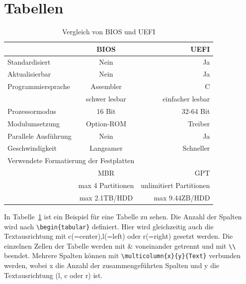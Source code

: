 \section{Tabellen}
\begin{table}[ht]
    \centering
    \begin{tabular}{ l c r }
        \toprule
                                & BIOS              & UEFI              \\
        \toprule
        \toprule
        Standardisiert          & Nein              & Ja                \\
        \midrule
        \midrule
        Aktualisierbar          & Nein              & Ja                \\
        \midrule
        \midrule
        Programmiersprache      & Assembler         & C                 \\
                                & schwer lesbar     & einfacher lesbar  \\
        \midrule
        \midrule
        Prozessormodus          & 16 Bit            & 32-64 Bit         \\
        Modulumsetzung          & Option-ROM        & Treiber           \\
        Parallele Ausführung    & Nein              & Ja                \\
        Geschwindigkeit         & Langsamer         & Schneller         \\
        \midrule
        \midrule
        \multicolumn{3}{l}{Verwendete Formatierung der Festplatten}\\
        \midrule
                                & MBR               & GPT               \\
                                & max 4 Partitionen & unlimitiert Partitionen\\
                                & max 2.1TB/HDD     & max 9.44ZB/HDD    \\
        \bottomrule
    \end{tabular}
    \caption{Vergleich von BIOS und UEFI}\label{tab:bios_uefi}
\end{table}

In Tabelle~\ref{tab:bios_uefi} ist ein Beispiel für eine Tabelle zu sehen.
Die Anzahl der Spalten wird nach \lstinline|\begin{tabular}| definiert.
Hier wird gleichzeitig auch die Textausrichtung mit c(=center),l(=left) oder r(=right) gesetzt werden. 
Die einzelnen Zellen der Tabelle werden mit \& voneinander getrennt und mit \lstinline|\\| beendet.
Mehrere Spalten können mit \lstinline|\multicolumn{x}{y}{Text}| verbunden werden,
wobei x die Anzahl der zusammengeführten Spalten und y die Textausrichtung (l, c oder r) ist.


